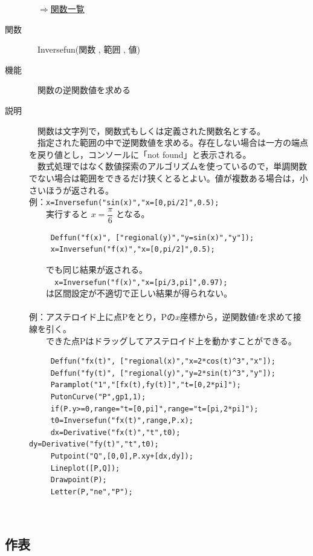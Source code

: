 \documentclass[papersize,a4paper,12pt,uplatex]{jsarticle}
\begin{document}
\begin{description}
\begin{flushright}　\hyperlink{functionlist}{$\Rightarrow$関数一覧}\end{flushright}
\newpage
\hypertarget{invesefun}{}
\item[関数]　Inversefun(関数 , 範囲 , 値)
\item[機能]　関数の逆関数値を求める
\item[説明]　関数は文字列で，関数式もしくは定義された関数名とする。\\
　指定された範囲の中で逆関数値を求める。存在しない場合は一方の端点を戻り値とし，コンソールに「not found」と表示される。\\
　数式処理ではなく数値探索のアルゴリズムを使っているので，単調関数でない場合は範囲をできるだけ狭くとるとよい。値が複数ある場合は，小さいほうが返される。\\

例：\verb|x=Inversefun("sin(x)","x=[0,pi/2]",0.5);|\\
　　実行すると $x=\dfrac{\pi}{6}$ となる。
\begin{verbatim}
　　　Deffun("f(x)", ["regional(y)","y=sin(x)","y"]);
　　　x=Inversefun("f(x)","x=[0,pi/2]",0.5);
\end{verbatim}
　　でも同じ結果が返される。\\
　　　\verb|x=Inversefun("f(x)","x=[pi/3,pi]",0.97);|\\
　　は区間設定が不適切で正しい結果が得られない。\\
　\\
例：アステロイド上に点Pをとり，Pの$x$座標から，逆関数値$t$を求めて接線を引く。\\
　　できた点Pはドラッグしてアステロイド上を動かすことができる。
\begin{verbatim}
　　　Deffun("fx(t)", ["regional(x)","x=2*cos(t)^3","x"]);
　　　Deffun("fy(t)", ["regional(y)","y=2*sin(t)^3","y"]);
　　　Paramplot("1","[fx(t),fy(t)]","t=[0,2*pi]");
　　　PutonCurve("P",gp1,1);
　　　if(P.y>=0,range="t=[0,pi]",range="t=[pi,2*pi]");
　　　t0=Inversefun("fx(t)",range,P.x);
　　　dx=Derivative("fx(t)","t",t0);　dy=Derivative("fy(t)","t",t0);
　　　Putpoint("Q",[0,0],P.xy+[dx,dy]);
　　　Lineplot([P,Q]);
　　　Drawpoint(P);
　　　Letter(P,"ne","P");
\end{verbatim}
　　　　　　　　　　　　

\end{description}
\newpage
\subsection{作表}
\end{document}
